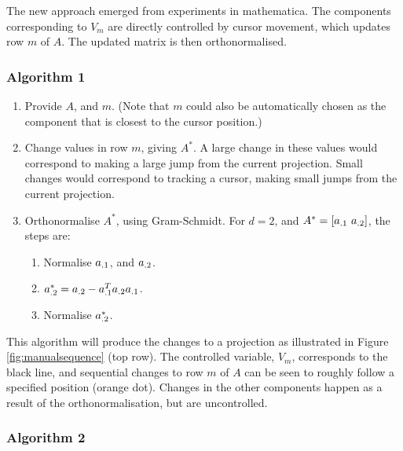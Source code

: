 \documentclass[]{interact}
\theoremstyle{plain}%
\theoremstyle{definition}
\theoremstyle{remark}
\def\tightlist{}
\begin{document}
The new approach emerged from experiments in mathematica. The components
corresponding to \(V_m\) are directly controlled by cursor movement,
which updates row \(m\) of \(A\). The updated matrix is then
orthonormalised.

\hypertarget{algorithm-1}{%
\subsubsection{Algorithm 1}\label{algorithm-1}}

\begin{enumerate}
\def\labelenumi{\arabic{enumi}.}
\item
  Provide \(A\), and \(m\). (Note that \(m\) could also be automatically
  chosen as the component that is closest to the cursor position.)
\item
  Change values in row \(m\), giving \(A^*\). A large change in these
  values would correspond to making a large jump from the current
  projection. Small changes would correspond to tracking a cursor,
  making small jumps from the current projection.
\item
  Orthonormalise \(A^*\), using Gram-Schmidt. For \(d=2\), and
  \(A^* = \left[ {\boldmath a}_{.1}~{\boldmath a}_{.2}\right]\), the
  steps are:

  \begin{enumerate}
  \def\labelenumii{\roman{enumii}.}
  \tightlist
  \item
    Normalise \({\boldmath a}_{.1}\), and \({\boldmath a}_{.2}\).
  \item
    \({\boldmath a}^*_{.2} = {\boldmath a}_{.2} - {\boldmath a}_{.1}^T{\boldmath a}_{.2}{\boldmath a}_{.1}\).
  \item
    Normalise \({\boldmath a}^*_{.2}\).
  \end{enumerate}
\end{enumerate}

This algorithm will produce the changes to a projection as illustrated
in Figure \ref{fig:manualsequence} (top row). The controlled variable,
\(V_m\), corresponds to the black line, and sequential changes to row
\(m\) of \(A\) can be seen to roughly follow a specified position
(orange dot). Changes in the other components happen as a result of the
orthonormalisation, but are uncontrolled.

\hypertarget{algorithm-2}{%
\subsubsection{Algorithm 2}\label{algorithm-2}}
\end{document}
